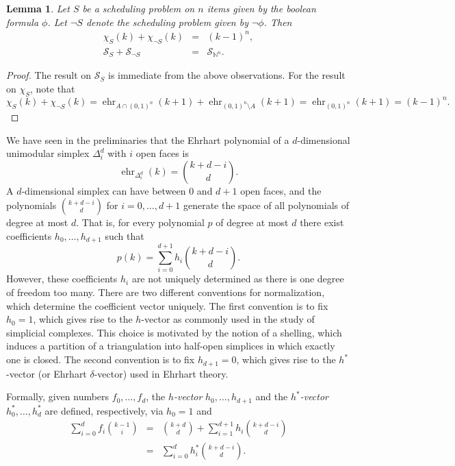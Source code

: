 \documentclass[12pt,reqno]{amsart}
\numberwithin{definition}{section}
\newtheorem{lemma}[definition]{Lemma}
\theoremstyle{definition}
\newcommand{\NN}{\mathbb{N}}
\newcommand{\SSS}{\mathcal{S}}
\newcommand{\ehr}{\operatorname{ehr}}
\newcommand{\poly}{\chi} %
\begin{document}
\begin{lemma}
Let $S$ be a scheduling problem on $n$ items given by the boolean formula $\phi$. Let $\neg S$ denote the scheduling problem given by $\neg\phi$. Then 
\begin{eqnarray*}
  \poly_{S}(k) + \poly_{\neg S}(k) &=& (k-1)^n, \\
  \SSS_S + \SSS_{\neg S} &=& \SSS_{\NN^n}.
\end{eqnarray*}
\end{lemma}


\begin{proof}
The result on $\SSS_S$ is immediate from the above observations. For the result on $\poly_S$, note that 
\[
 \poly_{S}(k) + \poly_{\neg S}(k) = \ehr_{A\cap(0,1)^n}(k+1) +  \ehr_{(0,1)^n\setminus A}(k+1) = \ehr_{(0,1)^n}(k+1) = (k-1)^n.
\]
\end{proof}

We have seen in the preliminaries that the Ehrhart polynomial of a $d$-dimensional unimodular simplex $\Delta^d_i$ with $i$ open faces is
\[
  \ehr_{\Delta^d_i}(k) = \binom{k+d-i}{d}.
\]
A $d$-dimensional simplex can have between 0 and $d+1$ open faces, and the polynomials $\binom{k+d-i}{d}$ for $i=0,\ldots,d+1$ generate the space of all polynomials of degree at most $d$. That is, for every polynomial $p$ of degree at most $d$ there exist coefficients $h_0,\ldots,h_{d+1}$ such that
\[
  p(k) = \sum_{i=0}^{d+1} h_i \binom{k+d-i}{d}.
\] 
However, these coefficients $h_i$ are not uniquely determined as there is one degree of freedom too many. There are two different conventions for normalization, which determine the coefficient vector uniquely. The first convention is to fix $h_0=1$, which gives rise to the $h$-vector as commonly used in the study of simplicial complexes. This choice is motivated by the notion of a shelling, which induces a partition of a triangulation into half-open simplices in which exactly one is closed. The second convention is to fix $h_{d+1}=0$, which gives rise to the $h^*$-vector (or Ehrhart $\delta$-vector) used in Ehrhart theory. 

Formally, given numbers $f_0,\ldots,f_d$, the \emph{$h$-vector} $h_0,\ldots,h_{d+1}$ and the \emph{$h^*$-vector} $h^*_0,\ldots,h^*_{d}$ are defined, respectively, via $h_0=1$ and
\begin{eqnarray*}
  \sum_{i=0}^{d} f_i \binom{k-1}{i} & = &
  \binom{k+d}{d} + \sum_{i=1}^{d+1} h_i \binom{k+d-i}{d} 
  \\ 
  & = & \sum_{i=0}^{d} h^*_i \binom{k+d-i}{d}. 
\end{eqnarray*}
\end{document}

